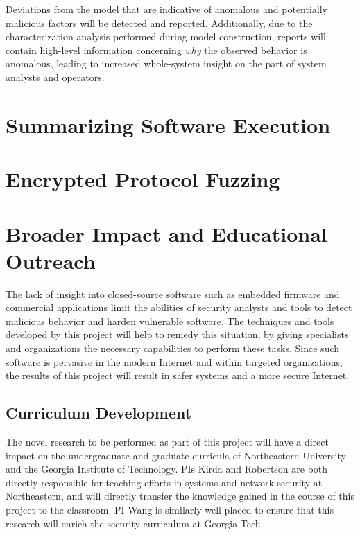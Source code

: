 \documentclass[letterpaper,twoside,11pt,headings=small]{scrartcl}
\begin{document}
Deviations from the model that are indicative of anomalous and potentially
malicious factors will be detected and reported.  Additionally, due to the
characterization analysis performed during model construction, reports will
contain high-level information concerning \emph{why} the observed behavior is
anomalous, leading to increased whole-system insight on the part of system
analysts and operators.

\section{Summarizing Software Execution}
\label{sec:research:autosummary}



\section{Encrypted Protocol Fuzzing}
\label{sec:research:fuzzing}



\section{Broader Impact and Educational Outreach}
\label{sec:impact}

The lack of insight into closed-source software such as embedded firmware and
commercial applications limit the abilities of security analysts and tools to
detect malicious behavior and harden vulnerable software.  The techniques and
tools developed by this project will help to remedy this situation, by
giving specialists and organizations the necessary capabilities to perform
these tasks.  Since such software is pervasive in the modern Internet and
within targeted organizations, the results of this project will result in
safer systems and a more secure Internet.

\subsection{Curriculum Development}
\label{sec:impact:curriculum}

The novel research to be performed as part of this project will have a direct
impact on the undergraduate and graduate curricula of Northeastern University
and the Georgia Institute of Technology.  PIs Kirda and Robertson are both
directly responsible for teaching efforts in systems and network security at
Northeastern, and will directly transfer the knowledge gained in the course
of this project to the classroom.  PI Wang is similarly well-placed to ensure
that this research will enrich the security curriculum at Georgia Tech.
\end{document}
